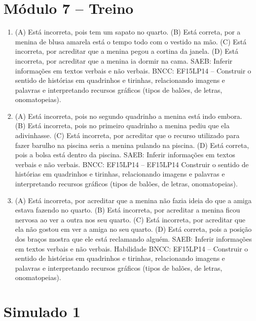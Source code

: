 \section*{Módulo 7 – Treino}

\begin{enumerate}
\item
(A) Está incorreta, pois tem um sapato no quarto.
(B) Está correta, por a menina de blusa amarela está o tempo todo com o
vestido na mão.
(C) Está incorreta, por acreditar que a menina pegou a cortina da janela.
(D) Está incorreta, por acreditar que a menina ia dormir na cama.
SAEB: Inferir informações em textos verbais e não verbais.
BNCC: EF15LP14 -- Construir o sentido de histórias em
quadrinhos e tirinhas, relacionando imagens e palavras e interpretando
recursos gráficos (tipos de balões, de letras, onomatopeias).

\item
(A) Está incorreta, pois no segundo quadrinho a menina está indo embora.
(B) Está incorreta, pois no primeiro quadrinho a menina pediu que ela
adivinhasse.
(C) Está incorreta, por acreditar que o recurso utilizado para fazer
barulho na piscina seria a menina pulando na piscina.
(D) Está correta, pois a bolsa está dentro da
piscina.
SAEB: Inferir informações em textos verbais e não verbais.
BNCC: EF15LP14 -- EF15LP14 Construir o sentido de histórias em
quadrinhos e tirinhas, relacionando imagens e palavras e interpretando
recursos gráficos (tipos de balões, de letras, onomatopeias).

\item
(A) Está incorreta, por acreditar que a menina não fazia ideia do que a
amiga estava fazendo no quarto.
(B) Está incorreta, por acreditar a menina ficou nervosa ao ver a outra
nos seu quarto.
(C) Está incorreta, por acreditar que ela não gostou em ver a amiga no
seu quarto.
(D) Está correta, pois a posição dos braços mostra que ele está
reclamando alguém.
SAEB: Inferir informações em textos verbais e não verbais.
Habilidade BNCC: EF15LP14 -- Construir o sentido de histórias em
quadrinhos e tirinhas, relacionando imagens e palavras e interpretando
recursos gráficos (tipos de balões, de letras, onomatopeias).
\end{enumerate}

\section*{Simulado 1}

